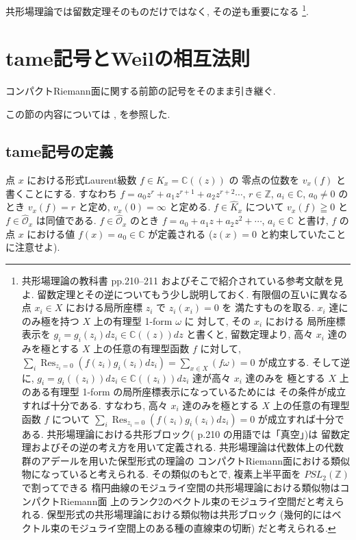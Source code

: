 \documentclass[12pt,twoside]{jarticle}
\newcommand\Z{{\mathbb Z}} %
\newcommand\C{{\mathbb C}} %
\theoremstyle{definition} %
\theoremstyle{definition} %
\theoremstyle{definition} %
\numberwithin{theorem}{section}
\numberwithin{equation}{section}
\numberwithin{figure}{section}
\numberwithin{table}{section}
\newcommand\Res{\mathop{\mathrm{Res}}\nolimits}
\newcommand\Khat{{\widehat K}}
\newcommand\OO{{\mathcal O}}
\newcommand\Ohat{{\widehat \OO}}
\begin{document}
共形場理論では留数定理そのものだけではなく, その逆も重要になる%
\footnote{共形場理論の教科書 \cite{yamada} pp.210--211 
およびそこで紹介されている参考文献を見よ.
留数定理とその逆についてもう少し説明しておく.
有限個の互いに異なる点 $x_i\in X$ における局所座標 $z_i$ で $z_i(x_i)=0$ を
満たすものを取る. $x_i$ 達にのみ極を持つ $X$ 上の有理型 1-form $\omega$ に
対して, その $x_i$ における
局所座標表示を $g_i=g_i(z_i)dz_i\in\C((z))dz$ と書くと, 
留数定理より, 高々 $x_i$ 達のみを極とする $X$ 上の任意の有理型函数 $f$ に対して,
$\sum_i\Res_{z_i=0}(f(z_i)g_i(z_i)dz_i)=\sum_{x\in X}(f\omega)=0$ が成立する.
そして逆に, $g_i=g_i((z_i))dz_i\in\C((z_i))dz_i$ 達が高々 $x_i$ 達のみを
極とする $X$ 上のある有理型 1-form の局所座標表示になっているためには
その条件が成立すれば十分である. 
すなわち, 高々 $x_i$ 達のみを極とする $X$ 上の任意の有理型函数 $f$ について
$\sum_i\Res_{z_i=0}(f(z_i)g_i(z_i)dz_i)=0$ が成立すれば十分である.
共形場理論における共形ブロック(\cite{yamada} p.210 の用語では「真空」)は
留数定理およびその逆の考え方を用いて定義される.
共形場理論は代数体上の代数群のアデールを用いた保型形式の理論の
コンパクトRiemann面における類似物になっていると考えられる.
その類似のもとで, 複素上半平面を $PSL_2(\Z)$ で割ってできる
楕円曲線のモジュライ空間の共形場理論における類似物はコンパクトRiemann面
上のランク2のベクトル束のモジュライ空間だと考えられる.
保型形式の共形場理論における類似物は共形ブロック
(幾何的にはベクトル束のモジュライ空間上のある種の直線束の切断)
だと考えられる.
}.


\section{tame記号とWeilの相互法則}

コンパクトRiemann面に関する前節の記号をそのまま引き継ぐ.

この節の内容については \cite{deligne}, \cite{kerr} を参照した.


\subsection{tame記号の定義}

点 $x$ における形式Laurent級数 $f\in\Khat_x=\C((z))$ の
零点の位数を $v_x(f)$ と書くことにする.
すなわち $f=a_0 z^r+a_1 z^{r+1}+a_2 z^{r+2}\cdots$, 
$r\in\Z$, $a_i\in\C$, $a_0\ne 0$ のとき $v_x(f)=r$ と定め, 
$v_x(0)=\infty$ と定める.
$f\in\Khat_x$ について $v_x(f)\geqq 0$ と $f\in\Ohat_x$ は同値である.
$f\in\Ohat_x$ のとき $f=a_0+a_1 z+ a_2 z^2+\cdots$, $a_i\in\C$ と書け, 
$f$ の点 $x$ における値 $f(x)=a_0\in\C$ が定義される
($z(x)=0$ と約束していたことに注意せよ).
\end{document}
